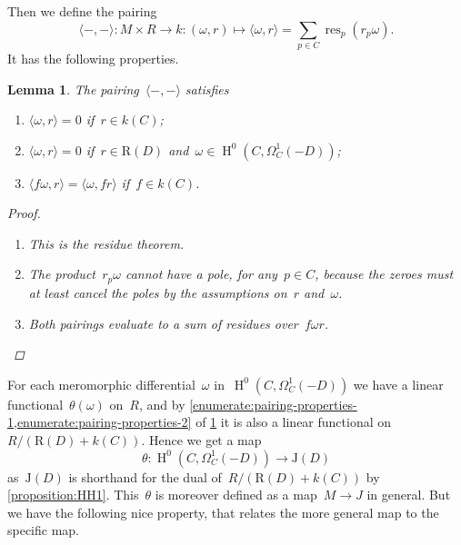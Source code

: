 \documentclass[10pt,a4paper]{article}
\theoremstyle{lecture}
\newtheorem{lemma}[theorem]{Lemma}
\DeclareMathOperator\HH{H}
\DeclareMathOperator\res{res}
\begin{document}
Then we define the pairing
\begin{equation}
  \langle-,-\rangle\colon M\times R\to k:(\omega,r)\mapsto\langle\omega,r\rangle=\sum_{p\in C}\res_p(r_p\omega).
\end{equation}
It has the following properties.
\begin{lemma}
  \label{lemma:pairing-properties}
  The pairing~$\langle-,-\rangle$ satisfies
  \begin{enumerate}
    \item\label{enumerate:pairing-properties-1} $\langle\omega,r\rangle=0$ if~$r\in k(C)$;
    \item\label{enumerate:pairing-properties-2} $\langle\omega,r\rangle=0$ if~$r\in \mathrm{R}(D)$ and~$\omega\in\HH^0(C,\Omega_C^1(-D))$;
    \item\label{enumerate:pairing-properties-3} $\langle f\omega,r\rangle=\langle\omega,fr\rangle$ if~$f\in k(C)$.
  \end{enumerate}

  \begin{proof}
    \begin{enumerate}
      \item This is the residue theorem.
      \item The product~$r_p\omega$ cannot have a pole, for any~$p\in C$, because the zeroes must at least cancel the poles by the assumptions on~$r$ and~$\omega$.
      \item Both pairings evaluate to a sum of residues over~$f\omega r$.
    \end{enumerate}
  \end{proof}
\end{lemma}
For each meromorphic differential~$\omega$ in~$\HH^0(C,\Omega_C^1(-D))$ we have a linear functional~$\theta(\omega)$ on~$R$, and by \cref{enumerate:pairing-properties-1,enumerate:pairing-properties-2} of \cref{lemma:pairing-properties} it is also a linear functional on~$R/(\mathrm{R}(D)+k(C))$. Hence we get a map
\begin{equation}
  \theta\colon\HH^0(C,\Omega_C^1(-D))\to\mathrm{J}(D)
\end{equation}
as~$\mathrm{J}(D)$ is shorthand for the dual of~$R/(\mathrm{R}(D)+k(C))$ by \cref{proposition:HH1}. This~$\theta$ is moreover defined as a map~$M\to J$ in general. But we have the following nice property, that relates the more general map to the specific map.
\end{document}
